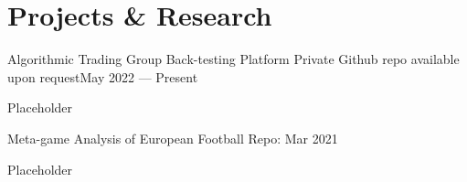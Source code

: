 \section{Projects \& Research}
\resumeSectionStart

    \resumeSubheading
        {Algorithmic Trading Group Back-testing Platform}{}
        {Private Github repo available upon request}{May 2022 --- Present}

    \resumeItemListStart
        \item Placeholder 
    \resumeItemListEnd

    \resumeSubheading
        {Meta-game Analysis of European Football}{}
        {Repo: }{Mar 2021}

    \resumeItemListStart
        \item Placeholder 

        \item 

    \resumeItemListEnd

\resumeSectionEnd